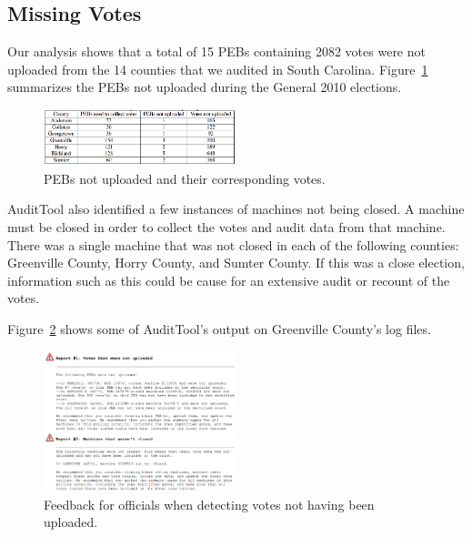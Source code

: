 \documentclass[letterpaper,twocolumn,10pt]{article}
\begin{document}
\subsection{Missing Votes}
Our analysis shows that a total of 15 PEBs containing 2082 votes were not
uploaded from the 14 counties that we audited in South
Carolina. Figure~\ref{fig:pebs-not-uploaded} summarizes the PEBs not uploaded
during the General 2010 elections.  

\begin{figure}[htbp]
\begin{center}
    \includegraphics[width=0.5\textwidth,height=0.1\textheight]{PEBsNotUploaded1.eps}
\end{center}
\caption{PEBs not uploaded and their corresponding votes.}
\label{fig:pebs-not-uploaded}
\end{figure}

AuditTool also identified a few instances of machines not being closed. A
machine must be closed in order to collect the votes and audit data from that
machine. There was a single machine that was not closed in each of the following
counties: Greenville County, Horry County, and Sumter County. If this was a
close election, information such as this could be cause for an extensive audit
or recount of the votes.  

Figure~\ref{fig:greenville-logs} shows some of AuditTool’s output on Greenville
County’s log files. 

\begin{figure}[htbp]
\begin{center}
    \includegraphics[width=0.5\textwidth,height=0.3\textheight]{VotesNotUploaded.eps}
\end{center}
\caption{Feedback for officials when detecting votes not having been uploaded.}
\label{fig:greenville-logs}
\end{figure}
\end{document}

